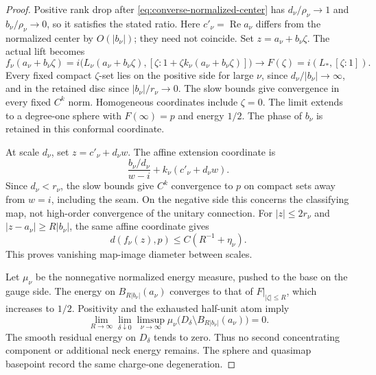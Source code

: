 \documentclass[11pt]{amsart}
\theoremstyle{definition}
\theoremstyle{remark}
\theoremstyle{plain}
\begin{document}
\begin{proof}
Positive rank drop after \eqref{eq:converse-normalized-center}
has $d_\nu/\rho_\nu\to1$ and $b_\nu/\rho_\nu\to0$,
so it satisfies the stated ratio. Here
$c'_\nu=\operatorname{Re}a_\nu$ differs from the normalized
center by $O(|b_\nu|)$; they need not coincide.
Set $z=a_\nu+b_\nu\zeta$. The actual lift becomes
\begin{equation}\label{eq:positive-sphere-extraction}
 f_\nu(a_\nu+b_\nu\zeta)
 =i\bigl(L_\nu(a_\nu+b_\nu\zeta),
       [\zeta:1+\zeta k_\nu(a_\nu+b_\nu\zeta)]\bigr)
 \longrightarrow F(\zeta)=i(L_*,[\zeta:1]).
\end{equation}
Every fixed compact $\zeta$-set lies on the positive side
for large $\nu$, since $d_\nu/|b_\nu|\to\infty$,
and in the retained disc since $|b_\nu|/r_\nu\to0$.
The slow bounds give convergence in every fixed $C^k$ norm.
Homogeneous coordinates include $\zeta=0$. The limit extends
to a degree-one sphere with $F(\infty)=p$ and energy $1/2$.
The phase of $b_\nu$ is retained in this conformal coordinate.

At scale $d_\nu$, set $z=c'_\nu+d_\nu w$. The affine
extension coordinate is
\[
       \frac{b_\nu/d_\nu}{w-i}+k_\nu(c'_\nu+d_\nu w).
\]
Since $d_\nu<r_\nu$, the slow bounds give $C^k$ convergence
to $p$ on compact sets away from $w=i$, including the seam.
On the negative side this concerns the classifying map,
not high-order convergence of the unitary connection.
For $|z|\leq2r_\nu$ and $|z-a_\nu|\geq R|b_\nu|$,
the same affine coordinate gives
\begin{equation}\label{eq:positive-sphere-neck-image}
                    d(f_\nu(z),p)\leq C(R^{-1}+\eta_\nu).
\end{equation}
This proves vanishing map-image diameter between scales.

Let $\mu_\nu$ be the nonnegative normalized energy measure,
pushed to the base on the gauge side. The energy on
$B_{R|b_\nu|}(a_\nu)$ converges to that of $F|_{|\zeta|\leq R}$,
which increases to $1/2$. Positivity and the exhausted
half-unit atom imply
\begin{equation}\label{eq:positive-sphere-energy-exhaustion}
 \lim_{R\to\infty}\lim_{\delta\downarrow0}\limsup_{\nu\to\infty}
 \mu_\nu\bigl(D_\delta\setminus
                    B_{R|b_\nu|}(a_\nu)\bigr)=0.
\end{equation}
The smooth residual energy on $D_\delta$ tends to zero.
Thus no second concentrating component or additional neck
energy remains. The sphere and quasimap basepoint record
the same charge-one degeneration.


\end{proof}
\end{document}
